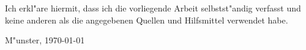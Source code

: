 
% 
% 
% 
% 

\thispagestyle{empty}
\hskip 0mm
\vfill
\bigskip\noindent Ich erkl"are hiermit, dass ich die vorliegende Arbeit
selbstst"andig verfasst und keine anderen als die angegebenen Quellen und Hilfsmittel verwendet habe.\par
\bigskip\noindent M"unster, \today\par
\vskip 10mm
\hfill\hrulefill
